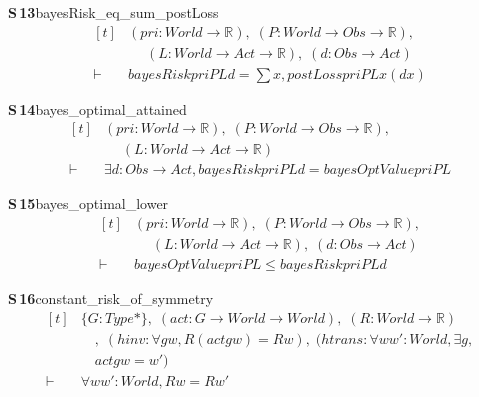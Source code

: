 \documentclass[conference]{IEEEtran}
\theoremstyle{definition}
\newcommand{\lean}[1]{\textsf{\footnotesize #1}}
\begin{document}
\noindent\textbf{S\,13}\quad\lean{bayesRisk\_eq\_sum\_postLoss}
{\footnotesize\[ \begin{aligned}[t]
&(\mathit{pri} : \mathit{World} \to \mathbb{R} ),\; (\mathit{P} : \mathit{World} \to \mathit{Obs} \to \mathbb{R} ),\\
&\quad \; (\mathit{L} : \mathit{World} \to \mathit{Act} \to \mathbb{R} ),\; (\mathit{d} : \mathit{Obs} \to \mathit{Act})\\
\vdash\;&\mathit{bayesRisk} \mathit{pri} \mathit{P} \mathit{L} \mathit{d} = \textstyle\sum \mathit{x}, \mathit{postLoss} \mathit{pri} \mathit{P} \mathit{L} \mathit{x} (\mathit{d} \mathit{x})
\end{aligned} \]}

\noindent\textbf{S\,14}\quad\lean{bayes\_optimal\_attained}
{\footnotesize\[ \begin{aligned}[t]
&(\mathit{pri} : \mathit{World} \to \mathbb{R} ),\; (\mathit{P} : \mathit{World} \to \mathit{Obs} \to \mathbb{R} ),\\
&\quad \; (\mathit{L} : \mathit{World} \to \mathit{Act} \to \mathbb{R} )\\
\vdash\;&\exists \mathit{d} : \mathit{Obs} \to \mathit{Act}, \mathit{bayesRisk} \mathit{pri} \mathit{P} \mathit{L} \mathit{d} = \mathit{bayesOptValue} \mathit{pri} \mathit{P} \mathit{L}
\end{aligned} \]}

\noindent\textbf{S\,15}\quad\lean{bayes\_optimal\_lower}
{\footnotesize\[ \begin{aligned}[t]
&(\mathit{pri} : \mathit{World} \to \mathbb{R} ),\; (\mathit{P} : \mathit{World} \to \mathit{Obs} \to \mathbb{R} ),\\
&\quad \; (\mathit{L} : \mathit{World} \to \mathit{Act} \to \mathbb{R} ),\; (\mathit{d} : \mathit{Obs} \to \mathit{Act})\\
\vdash\;&\mathit{bayesOptValue} \mathit{pri} \mathit{P} \mathit{L} \leq \mathit{bayesRisk} \mathit{pri} \mathit{P} \mathit{L} \mathit{d}
\end{aligned} \]}

\noindent\textbf{S\,16}\quad\lean{constant\_risk\_of\_symmetry}
{\footnotesize\[ \begin{aligned}[t]
&\{ \mathit{G} : \mathit{Type}*\},\; (\mathit{act} : \mathit{G} \to \mathit{World} \to \mathit{World}),\; (\mathit{R} : \mathit{World} \to \mathbb{R} )\\
&\quad ,\; (\mathit{hinv} : \forall \mathit{g} \mathit{w}, \mathit{R} (\mathit{act} \mathit{g} \mathit{w}) = \mathit{R} \mathit{w}),\; (\mathit{htrans} : \forall \mathit{w} \mathit{w'} : \mathit{World}, \exists \mathit{g},\\
&\quad \mathit{act} \mathit{g} \mathit{w} = \mathit{w'})\\
\vdash\;&\forall \mathit{w} \mathit{w'} : \mathit{World}, \mathit{R} \mathit{w} = \mathit{R} \mathit{w'}
\end{aligned} \]}
\end{document}
